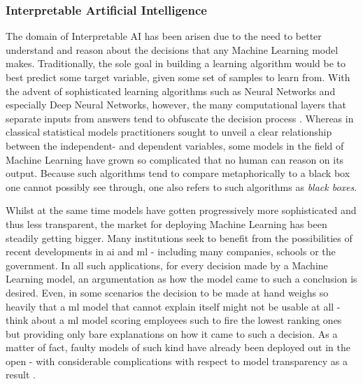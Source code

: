 \documentclass[../main.tex]{subfiles}
\begin{document}
\subsubsection{Interpretable Artificial Intelligence}
The domain of Interpretable AI has been arisen due to the need to better understand and reason about the decisions that any Machine Learning model makes. Traditionally, the sole goal in building a learning algorithm would be to best predict some target variable, given some set of samples to learn from. With the advent of sophisticated learning algorithms such as Neural Networks and especially Deep Neural Networks, however, the many computational layers that separate inputs from answers tend to obfuscate the decision process \citep{rai_explainable_2020}. Whereas in classical statistical models practitioners sought to unveil a clear relationship between the independent- and dependent variables, some models in the field of Machine Learning have grown so complicated that no human can reason on its output. Because such algorithms tend to compare metaphorically to a black box one cannot possibly see through, one also refers to such algorithms as \textit{black boxes}.

Whilst at the same time models have gotten progressively more sophisticated and thus less transparent, the market for deploying Machine Learning has been steadily getting bigger. Many institutions seek to benefit from the possibilities of recent developments in \gls{ai} and \gls{ml} - including many companies, schools or the government. In all such applications, for every decision made by a Machine Learning model, an argumentation as how the model came to such a conclusion is desired. Even, in some scenarios the decision to be made at hand weighs so heavily that a \gls{ml} model that cannot explain itself might not be usable at all - think about a \gls{ml} model scoring employees such to fire the lowest ranking ones but providing only bare explanations on how it came to such a decision. As a matter of fact, faulty models of such kind have already been deployed out in the open - with considerable complications with respect to model transparency as a result \citep{oneil_weapons_2016}.
\end{document}
